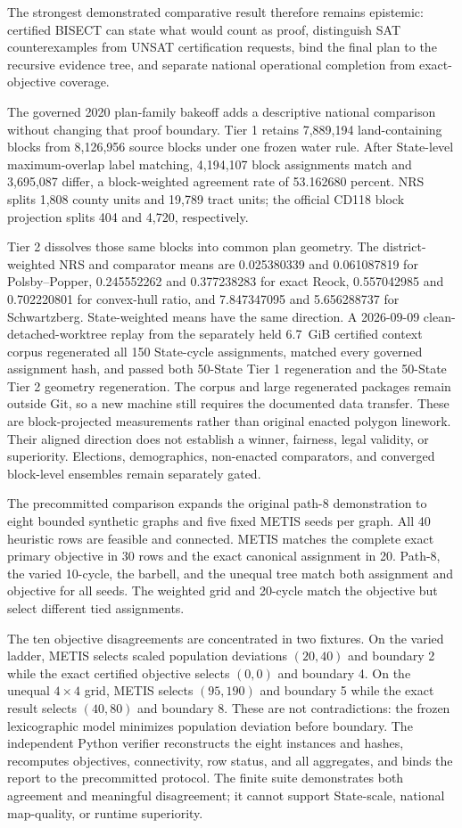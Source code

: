The strongest demonstrated comparative result therefore remains epistemic:
certified BISECT can state what would count as proof, distinguish SAT
counterexamples from UNSAT certification requests, bind the final plan to the
recursive evidence tree, and separate national operational completion from
exact-objective coverage.

The governed 2020 plan-family bakeoff adds a descriptive national comparison
without changing that proof boundary. Tier 1 retains 7,889,194 land-containing
blocks from 8,126,956 source blocks under one frozen water rule. After
State-level maximum-overlap label matching, 4,194,107 block assignments match
and 3,695,087 differ, a block-weighted agreement rate of 53.162680 percent.
NRS splits 1,808 county units and 19,789 tract units; the official CD118 block
projection splits 404 and 4,720, respectively.

Tier 2 dissolves those same blocks into common plan geometry. The
district-weighted NRS and comparator means are 0.025380339 and 0.061087819 for
Polsby--Popper, 0.245552262 and 0.377238283 for exact Reock, 0.557042985 and
0.702220801 for convex-hull ratio, and 7.847347095 and 5.656288737 for
Schwartzberg. State-weighted means have the same direction. A 2026-09-09
clean-detached-worktree replay from the separately held 6.7~GiB certified
context corpus regenerated all 150 State-cycle assignments, matched every
governed assignment hash, and passed both 50-State Tier 1 regeneration and the
50-State Tier 2 geometry regeneration. The corpus and large regenerated
packages remain outside Git, so a new machine still requires the documented
data transfer. These are block-projected measurements rather than original
enacted polygon linework. Their aligned direction does not establish a winner,
fairness, legal validity, or superiority. Elections, demographics,
non-enacted comparators, and converged block-level ensembles remain separately
gated.

The precommitted comparison expands the original path-8 demonstration to eight
bounded synthetic graphs and five fixed METIS seeds per graph. All 40 heuristic
rows are feasible and connected. METIS matches the complete exact primary
objective in 30 rows and the exact canonical assignment in 20. Path-8, the
varied 10-cycle, the barbell, and the unequal tree match both assignment and
objective for all seeds. The weighted grid and 20-cycle match the objective but
select different tied assignments.

The ten objective disagreements are concentrated in two fixtures. On the
varied ladder, METIS selects scaled population deviations $(20,40)$ and
boundary 2 while the exact certified objective selects $(0,0)$ and boundary 4.
On the unequal $4\times4$ grid, METIS selects $(95,190)$ and boundary 5 while
the exact result selects $(40,80)$ and boundary 8. These are not contradictions:
the frozen lexicographic model minimizes population deviation before boundary.
The independent Python verifier reconstructs the eight instances and hashes,
recomputes objectives, connectivity, row status, and all aggregates, and binds
the report to the precommitted protocol. The finite suite demonstrates both
agreement and meaningful disagreement; it cannot support State-scale,
national map-quality, or runtime superiority.
